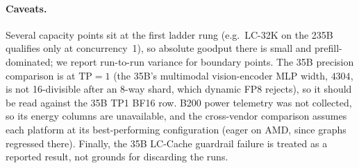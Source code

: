\paragraph{Caveats.}
Several capacity points sit at the first ladder rung (e.g.\ LC-32K on the 235B
qualifies only at concurrency~1), so absolute goodput there is small and
prefill-dominated; we report run-to-run variance for boundary points. The 35B
precision comparison is at $\text{TP}{=}1$ (the 35B's multimodal vision-encoder MLP
width, $4304$, is not 16-divisible after an 8-way shard, which dynamic FP8 rejects),
so it should be read against the 35B TP1 BF16 row.
B200 power telemetry was not collected, so its energy columns are unavailable, and
the cross-vendor comparison assumes each platform at its best-performing
configuration (eager on AMD, since graphs regressed there). Finally, the 35B
LC-Cache guardrail failure is treated as a reported result, not grounds for
discarding the runs.
